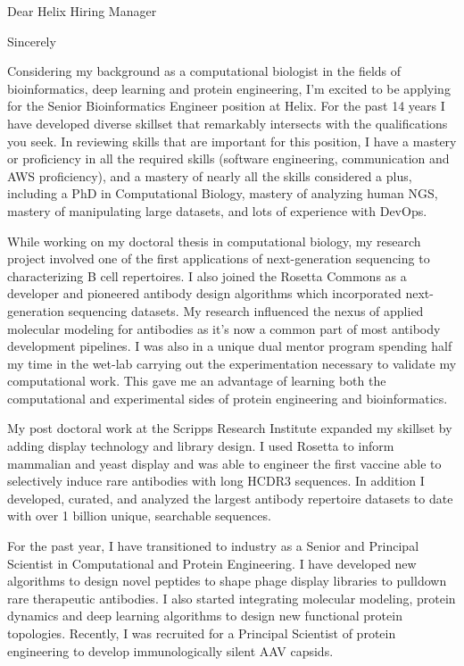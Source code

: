 \documentclass[11pt,a4paper,sans]{moderncv}        %
\title{}                               %
\begin{document}
\date{2020}
\opening{Dear Helix Hiring Manager}
\closing{Sincerely}
\makelettertitle


Considering my background as a computational biologist in the fields of bioinformatics, deep learning and protein engineering, I'm excited to be applying for the
Senior Bioinformatics Engineer position at Helix. 
For the past 14 years I have developed diverse skillset that remarkably intersects with the qualifications you seek. In reviewing skills that are important for this position, I have a mastery or proficiency in all the required skills (software engineering, communication and AWS proficiency), 
and  a mastery of nearly all the skills considered a plus, including a PhD in Computational Biology, mastery of analyzing human NGS, mastery of manipulating large datasets, and lots of experience with DevOps. 

While working on my doctoral thesis in computational biology, my research project involved one of the first applications of next-generation 
sequencing to characterizing B cell repertoires. 
I also joined the Rosetta Commons as a developer and pioneered antibody design algorithms which incorporated next-generation sequencing datasets. My research influenced the nexus of applied molecular modeling for antibodies as it's now a common part of most antibody development pipelines. I was also in a unique dual 
mentor program spending half my time in the wet-lab carrying out the experimentation necessary to validate my computational work. This gave me an advantage 
of learning both the computational and experimental sides of protein engineering and bioinformatics.

\vspace{0.1in}
My post doctoral work at the Scripps Research Institute expanded my skillset by adding display technology and library design. I used Rosetta to inform 
mammalian and yeast 
display and was able to engineer the first vaccine able to selectively induce rare antibodies with long HCDR3 sequences.  In addition I developed, curated, and analyzed the largest antibody 
repertoire datasets to date with over 1 billion unique, searchable sequences.

For the past year, I have transitioned to industry as a 
Senior and Principal Scientist in Computational and Protein Engineering. I have developed new algorithms to design novel peptides to shape phage display libraries to pulldown rare therapeutic antibodies.
I also started integrating molecular modeling, protein dynamics and deep learning algorithms to design new functional protein topologies. Recently, I was recruited for a Principal Scientist of protein engineering to develop immunologically silent AAV capsids. 
\end{document}
